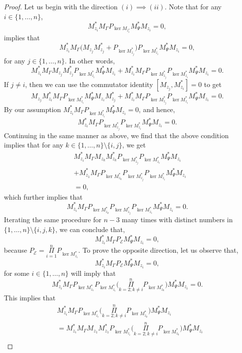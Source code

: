 \documentclass[12pt]{amsart}
\theoremstyle{definition}
\newcommand{\1}{{\mbox{\bf 1}}}
\newcommand{\cle}{\mathcal{E}}
\begin{document}
\begin{proof}
Let us begin with the direction $(i) \implies (ii)$. Note that for any $i \in \{1,\ldots,n\}$,  
\[
M_{z_i}^*M_{\Gamma} P_{\ker M_{z_i^*}} M_{\Psi}^*  M_{z_i}= 0,
\]
implies that
\[
M_{z_i}^* M_{\Gamma} \big( M_{z_j} M_{z_j}^* + P_{\ker M_{z_j}^*} \big) P_{\ker M_{z_i}^*}  M_{\Psi}^* M_{z_i} = 0,
\]
for any $j \in \{1,\ldots,n\}$. In other words,
\[
M_{z_i}^* M_{\Gamma} M_{z_j} M_{z_j}^* P_{\ker M_{z_i}^*}  M_{\Psi}^* M_{z_i}+ M_{z_i}^* M_{\Gamma} P_{\ker M_{z_j}^*}   P_{\ker M_{z_i}^*}  M_{\Psi}^* M_{z_i} = 0.
\]
If $j \neq i$, then we can use the commutator identity $[M_{z_j}, M_{z_i}^*] = 0$ to get
\[
M_{z_j} M_{z_i}^* M_{\Gamma}  P_{\ker M_{z_i}^*}  M_{\Psi}^* M_{z_i} M_{z_j}^* + M_{z_i}^* M_{\Gamma} P_{\ker M_{z_j}^*}   P_{\ker M_{z_i}^*}  M_{\Psi}^* M_{z_i} = 0.
\]
By our assumption $M_{z_i}^* M_{\Gamma}  P_{\ker M_{z_i}^*}  M_{\Psi}^* M_{z_i}=0$, and hence,
\[
M_{z_i}^* M_{\Gamma} P_{\ker M_{z_j}^*}   P_{\ker M_{z_i}^*}  M_{\Psi}^* M_{z_i} = 0.
\]
Continuing in the same manner as above, we find that the above condition implies that for any $k \in \{1,\ldots,n\} \setminus \{i,j\}$, we get
\begin{align*}
&M_{z_i}^* M_{\Gamma}M_{z_k} M_{z_k}^* P_{\ker M_{z_j}^*}   P_{\ker M_{z_i}^*}  M_{\Psi}^* M_{z_i}  \\
&+ M_{z_1}^* M_{\Gamma}  P_{\ker M_{z_k}^*} P_{\ker M_{z_j}^*}   P_{\ker M_{z_i}^*}  M_{\Psi}^* M_{z_i} \\
&= 0,
\end{align*}
which further implies that
\[
M_{z_i}^* M_{\Gamma} P_{\ker M_{z_k}^*} P_{\ker M_{z_j}^*}   P_{\ker M_{z_i}^*}  M_{\Psi}^* M_{z_i} = 0.
\]
Iterating the same procedure for $n-3$ many times with distinct numbers in $\{1,\ldots,n\} \setminus \{i,j,k\}$, we can conclude that,
\[
M_{z_i}^* M_{\Gamma} P_{\cle} M_{\Psi}^* M_{z_i} = 0,
\]
because $P_{\cle} = \underset{i=1}{\overset{n}{\Pi}} P_{\ker M_{z_i}^*}$. To prove the opposite direction, let us observe that,
\[
M_{z_i}^* M_{\Gamma} P_{\cle} M_{\Psi}^* M_{z_i} = 0,
\]
for some $i \in \{1,\ldots,n\}$ will imply that
\[
M_{z_i}^* M_{\Gamma} P_{\ker M_{z_1}^*} P_{\ker M_{z_i}^*} \big( \underset{k=2; k \neq i}{\overset{n}{\Pi}}  P_{\ker M_{z_k}^*} \big)  M_{\Psi}^* M_{z_i} = 0.
\]
This implies that
\begin{align*}
&M_{z_i}^* M_{\Gamma} P_{\ker M_{z_i}^*} \big( \underset{k=2; k \neq i}{\overset{n}{\Pi}} P_{\ker M_{z_k}^*} \big) M_{\Psi}^* M_{z_i} \\
&= M_{z_i}^* M_{\Gamma}  M_{z_1}M_{z_1}^*P_{\ker M_{z_i}^*} \big( \underset{k=2; k \neq i}{\overset{n}{\Pi}} P_{\ker M_{z_k}^*} \big)  M_{\Psi}^* M_{z_i}\\

\end{align*}
\end{proof}
\end{document}
